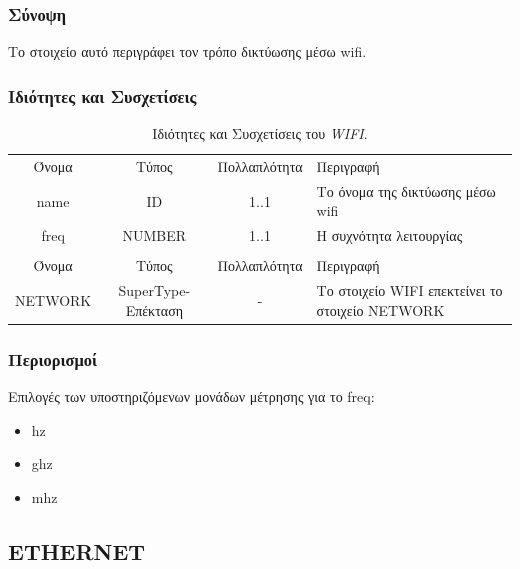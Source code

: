 \subsubsection*{Σύνοψη}

\noindent Το στοιχείο αυτό περιγράφει τον τρόπο δικτύωσης μέσω wifi.

\subsubsection*{Ιδιότητες και Συσχετίσεις}

\begin{table}[H]
	\begin{center}
		\begin{tabular}{ | c | c | c| m{5.5cm} | }
			\hline
			\rowcolor{Gray}
			\multicolumn{4}{|c|}{\textbf{Ιδιότητες}}\\
			\hline
			\rowcolor{Gray}
			Όνομα & Τύπος & Πολλαπλότητα & Περιγραφή \\
			\hline
			name & ID & 1..1 & Το όνομα της δικτύωσης μέσω wifi \\
			\hline
			freq & NUMBER & 1..1 & Η συχνότητα λειτουργίας \\
			\hline
			\rowcolor{Gray}
			\multicolumn{4}{|c|}{\textbf{Συσχετίσεις}}\\
			\hline
			\rowcolor{Gray}
			Όνομα & Τύπος & Πολλαπλότητα & Περιγραφή \\
			\hline
			NETWORK & SuperType-Επέκταση & - &  Το στοιχείο WIFI επεκτείνει το στοιχείο NETWORK \\
			\hline
		\end{tabular}
		\caption{Ιδιότητες και Συσχετίσεις του \textit{WIFI}.}
		\label{tab:wifi}
	\end{center}
\end{table}

\subsubsection*{Περιορισμοί}

\noindent Επιλογές των υποστηριζόμενων μονάδων μέτρησης για το freq:

\begin{itemize}
	\item hz
	\item ghz
	\item mhz
\end{itemize}

\subsection{ETHERNET}
\label{subsec:ethernet}

